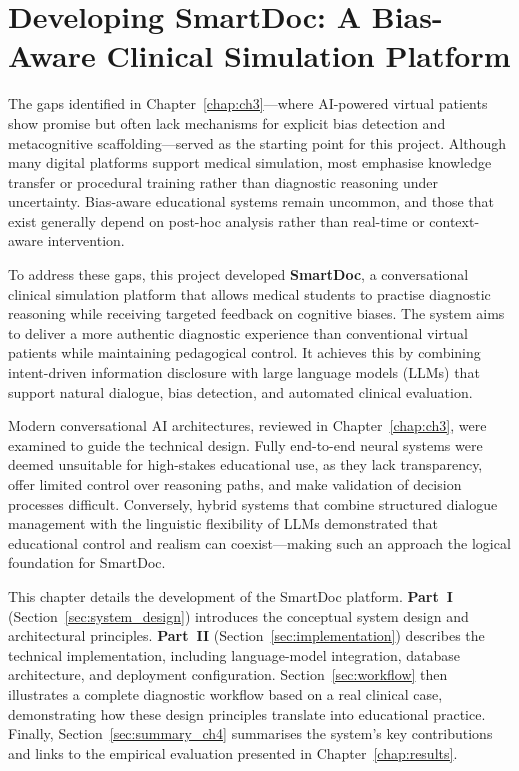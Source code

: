 \chapter{Developing SmartDoc: A Bias-Aware Clinical Simulation Platform}
\label{chap:ch4}

The gaps identified in Chapter~\ref{chap:ch3}—where AI-powered virtual patients show promise
but often lack mechanisms for explicit bias detection and metacognitive scaffolding—served
as the starting point for this project.
Although many digital platforms support medical simulation, most emphasise knowledge transfer
or procedural training rather than diagnostic reasoning under uncertainty.
Bias-aware educational systems remain uncommon, and those that exist generally depend on
post-hoc analysis rather than real-time or context-aware intervention.

To address these gaps, this project developed \textbf{SmartDoc}, a conversational clinical
simulation platform that allows medical students to practise diagnostic reasoning while
receiving targeted feedback on cognitive biases.
The system aims to deliver a more authentic diagnostic experience than conventional
virtual patients while maintaining pedagogical control.
It achieves this by combining intent-driven information disclosure with
large language models (LLMs) that support natural dialogue, bias detection, and
automated clinical evaluation.

Modern conversational AI architectures, reviewed in Chapter~\ref{chap:ch3},
were examined to guide the technical design.
Fully end-to-end neural systems were deemed unsuitable for high-stakes educational use,
as they lack transparency, offer limited control over reasoning paths,
and make validation of decision processes difficult.
Conversely, hybrid systems that combine structured dialogue management
with the linguistic flexibility of LLMs demonstrated that educational control
and realism can coexist—making such an approach the logical foundation
for SmartDoc.

This chapter details the development of the SmartDoc platform.
\textbf{Part~I} (Section~\ref{sec:system_design}) introduces the conceptual system design
and architectural principles.
\textbf{Part~II} (Section~\ref{sec:implementation}) describes the technical implementation,
including language-model integration, database architecture, and deployment configuration.
Section~\ref{sec:workflow} then illustrates a complete diagnostic workflow based on a
real clinical case, demonstrating how these design principles translate into educational
practice.
Finally, Section~\ref{sec:summary_ch4} summarises the system’s key contributions
and links to the empirical evaluation presented in Chapter~\ref{chap:results}.

